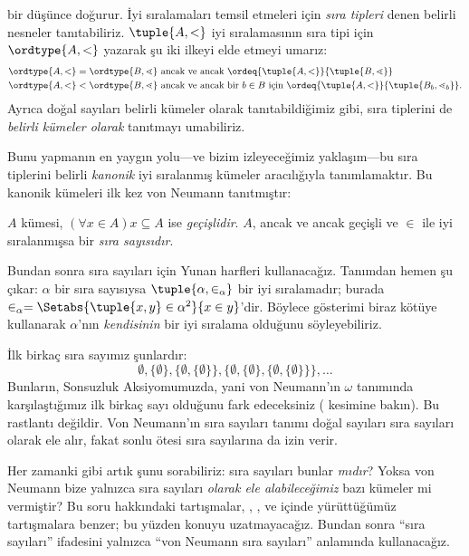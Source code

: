 \documentclass[../../../include/open-logic-section]{subfiles}
\begin{document}

 bir düşünce doğurur.
İyi sıralamaları temsil etmeleri için \emph{sıra tipleri} denen belirli
nesneler tanıtabiliriz. $\tuple{A,<}$ iyi sıralamasının sıra tipi için
$\ordtype{A,<}$ yazarak şu iki ilkeyi elde etmeyi umarız:
\begin{align*}
	\ordtype{A, <} = \ordtype{B, \lessdot} &
	\text{ ancak ve ancak } \ordeq{\tuple{A, <}}{\tuple{B, \lessdot}}\\
	\ordtype{A, <} < \ordtype{B, \lessdot}&
	\text{ ancak ve ancak bir }b \in B\text{ için }
	\ordeq{\tuple{A, <}}{\tuple{B_b, \lessdot_b}}.
\end{align*}
Ayrıca doğal sayıları belirli kümeler olarak tanıtabildiğimiz gibi, sıra
tiplerini de \emph{belirli kümeler olarak} tanıtmayı umabiliriz.

Bunu yapmanın en yaygın yolu---ve bizim izleyeceğimiz yaklaşım---bu sıra
tiplerini belirli \emph{kanonik} iyi sıralanmış kümeler aracılığıyla
tanımlamaktır. Bu kanonik kümeleri ilk kez von Neumann tanıtmıştır:

\begin{defn}
$A$ kümesi, $(\forall x\in A)x\subseteq A$ ise \emph{geçişlidir}.
$A$, ancak ve ancak geçişli ve $\in$ ile iyi sıralanmışsa bir
\emph{sıra sayısıdır}.
\end{defn}
\noindent
Bundan sonra sıra sayıları için Yunan harfleri kullanacağız. Tanımdan
hemen şu çıkar: $\alpha$ bir sıra sayısıysa
$\tuple{\alpha,\in_\alpha}$ bir iyi sıralamadır; burada
$\in_\alpha=\Setabs{\tuple{x,y}\in\alpha^2}{x\in y}$'dir. Böylece
gösterimi biraz kötüye kullanarak $\alpha$'nın \emph{kendisinin} bir iyi
sıralama olduğunu söyleyebiliriz.

İlk birkaç sıra sayımız şunlardır:
\[
	\emptyset, \{\emptyset\},
	\{\emptyset, \{\emptyset\}\},
	\{\emptyset, \{\emptyset\}, \{\emptyset, \{\emptyset\}\}\}, \ldots
\]
Bunların, Sonsuzluk Aksiyomumuzda, yani von Neumann'ın $\omega$ tanımında
karşılaştığımız ilk birkaç sayı olduğunu fark edeceksiniz
( kesimine bakın). Bu rastlantı değildir.
Von Neumann'ın sıra sayıları tanımı doğal sayıları sıra sayıları olarak ele
alır, fakat sonlu ötesi sıra sayılarına da izin verir.

Her zamanki gibi artık şunu sorabiliriz: sıra sayıları bunlar \emph{mıdır}?
Yoksa von Neumann bize yalnızca sıra sayıları \emph{olarak ele
alabileceğimiz} bazı kümeler mi vermiştir? Bu soru hakkındaki tartışmalar,
, ,
 ve
 içinde yürüttüğümüz tartışmalara benzer; bu yüzden
konuyu uzatmayacağız. Bundan sonra ``sıra sayıları'' ifadesini yalnızca
``von Neumann sıra sayıları'' anlamında kullanacağız.
\end{document}
